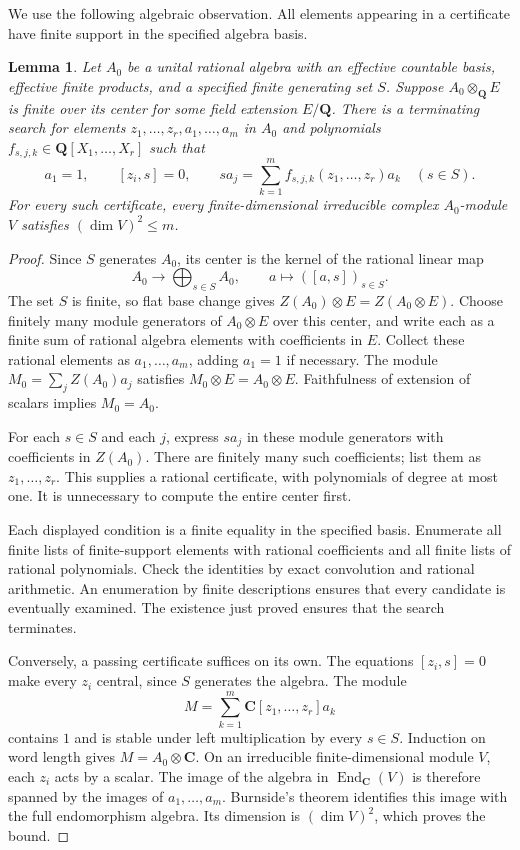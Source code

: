 \documentclass[10pt,letterpaper]{amsart}
\numberwithin{equation}{section}
\newtheorem{lemma}[theorem]{Lemma}
\theoremstyle{remark}
\begin{document}
We use the following algebraic observation. All elements appearing in a
certificate have finite support in the specified algebra basis.

\begin{lemma}\label{lem:finite-central-certificate}
Let $A_0$ be a unital rational algebra with an effective countable basis,
effective finite products, and a specified finite generating set $S$.
Suppose $A_0\otimes_{\mathbf Q}E$ is finite over its center for some
field extension $E/\mathbf Q$. There is a terminating search for elements
$z_1,\ldots,z_r,a_1,\ldots,a_m$ in $A_0$ and polynomials
$f_{s,j,k}\in\mathbf Q[X_1,\ldots,X_r]$ such that
\begin{equation}\label{eq:finite-central-certificate}
 a_1=1,\qquad [z_i,s]=0,\qquad
 sa_j=\sum_{k=1}^{m}f_{s,j,k}(z_1,\ldots,z_r)a_k
 \quad(s\in S).
\end{equation}
For every such certificate, every finite-dimensional irreducible complex
$A_0$-module $V$ satisfies $(\dim V)^2\le m$.
\end{lemma}

\begin{proof}
Since $S$ generates $A_0$, its center is the kernel of the rational linear map
\[
 A_0\longrightarrow\bigoplus_{s\in S}A_0,
 \qquad a\longmapsto([a,s])_{s\in S}.
\]
The set $S$ is finite, so flat base change gives
$Z(A_0)\otimes E=Z(A_0\otimes E)$. Choose finitely many module generators
of $A_0\otimes E$ over this center, and write each as a finite sum of
rational algebra elements with coefficients in $E$. Collect these
rational elements as $a_1,\ldots,a_m$, adding $a_1=1$ if necessary.
The module $M_0=\sum_j Z(A_0)a_j$ satisfies $M_0\otimes E=A_0\otimes E$.
Faithfulness of extension of scalars implies $M_0=A_0$.

For each $s\in S$ and each $j$, express $sa_j$ in these module generators
with coefficients in $Z(A_0)$. There are finitely many such coefficients;
list them as $z_1,\ldots,z_r$. This supplies a rational certificate, with
polynomials of degree at most one. It is unnecessary to compute the
entire center first.

Each displayed condition is a finite equality in the specified basis.
Enumerate all finite lists of finite-support elements with rational
coefficients and all finite lists of rational polynomials. Check the
identities by exact convolution and rational arithmetic. An enumeration
by finite descriptions ensures that every candidate is eventually
examined. The existence just proved ensures that the search terminates.

Conversely, a passing certificate suffices on its own. The equations
$[z_i,s]=0$ make every $z_i$ central, since $S$ generates the algebra.
The module
\[
 M=\sum_{k=1}^{m}\mathbf C[z_1,\ldots,z_r]a_k
\]
contains $1$ and is stable under left multiplication by every $s\in S$.
Induction on word length gives $M=A_0\otimes\mathbf C$.
On an irreducible finite-dimensional module $V$, each $z_i$ acts by a
scalar. The image of the algebra in $\operatorname{End}_{\mathbf C}(V)$
is therefore spanned by the images of $a_1,\ldots,a_m$. Burnside's theorem
identifies this image with the full endomorphism algebra. Its dimension
is $(\dim V)^2$, which proves the bound.
\end{proof}
\end{document}
